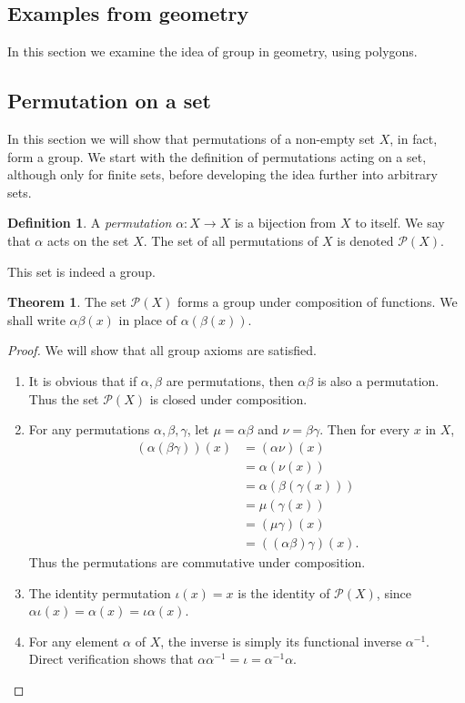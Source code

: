 \documentclass[12pt]{book}
\newcommand{\ii}{\item}
\newcommand{\ra}{\rightarrow}
\theoremstyle{definition}
\newtheorem{definition}{Definition}[section]
\newtheorem{theorem}{Theorem}[chapter]
\theoremstyle{remark}
\begin{document}
	\subsection{Examples from geometry}
		In this section we examine the idea of group in geometry, using polygons.
		
		
	\subsection{Permutation on a set}
				In this section we will show that permutations of a non-empty set $X$, in fact, form a group. 
				We start with the definition of permutations acting on a set, although only for finite sets, before developing the idea further into arbitrary sets.
				
				\begin{definition}
					A \textit{permutation} $\alpha \colon X \ra X$ is a bijection from $X$ to itself. We say that $\alpha$ acts on the set $X$. The set of all permutations of $X$ is denoted $\mathcal{P}(X)$.				
				\end{definition}
				This set is indeed a group.
				\begin{theorem}
					The set $\mathcal{P}(X)$ forms a group under composition of functions. We shall write $\alpha\beta(x)$ in place of $\alpha(\beta(x))$.
				\end{theorem}
				\begin{proof}
					We will show that all group axioms are satisfied.
					\begin{enumerate}
						\item It is obvious that if $\alpha, \beta$ are permutations, then $\alpha\beta$ is also a permutation. Thus the set $\mathcal{P}(X)$ is closed under composition.
						
						\item For any permutations $\alpha, \beta, \gamma$, let $\mu = \alpha\beta$ and $\nu = \beta\gamma$. Then for every $x$ in $X$,
						\begin{equation}
						\begin{aligned}
							(\alpha(\beta\gamma))(x) & = (\alpha\nu)(x) \\
									& = \alpha(\nu(x))	\\
									& = \alpha(\beta(\gamma(x))) \\
									& = \mu(\gamma(x))	\\
									& = (\mu\gamma)(x) \\
									& = ((\alpha\beta)\gamma)(x).
						\end{aligned}
						\end{equation}
						Thus the permutations are commutative under composition.
						
						\ii The identity permutation $\iota (x) = x$ is the identity of $\mathcal{P}(X)$, since $\alpha\iota(x) = \alpha(x) = \iota\alpha(x)$.
						
						\ii For any element $\alpha$ of $X$, the inverse is simply its functional inverse $\alpha^{-1}$. Direct verification shows that $\alpha\alpha^{-1} = \iota = \alpha^{-1}\alpha$.
					\end{enumerate}
				\end{proof}
\end{document}
